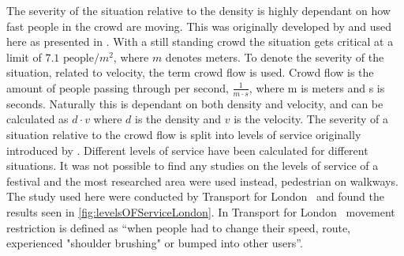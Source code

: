 The severity of the situation relative to the density is highly dependant on how fast people in the crowd are moving. This was originally developed by \citet{crowdDistasters} and used here as presented in \citet{wirz2013probing}. With a still standing crowd the situation gets critical at a limit of $7.1 \text{ people} / m^2$, where $m$ denotes meters. To denote the severity of the situation, related to velocity, the term crowd flow is used. Crowd flow is the amount of people passing through per second, $\frac{1}{m \cdot s}$, where m is meters and s is seconds. Naturally this is dependant on both density and velocity, and can be calculated as ${d} \cdot {v}$ where $d$ is the density and $v$ is the velocity. The severity of a situation relative to the crowd flow is split into levels of service originally introduced by \citet{crowdDistasters}. Different levels of service have been calculated for different situations. It was not possible to find any studies on the levels of service of a festival and the most researched area were used instead, pedestrian on walkways. The study used here were conducted by Transport for London~\cite{levelsOfServiceLondon} and found the results seen in \cref{fig:levelsOFServiceLondon}. In Transport for London~\cite{levelsOfServiceLondon} movement restriction is defined as \enquote{when people had to change their speed, route, experienced "shoulder brushing" or bumped into other users}.

